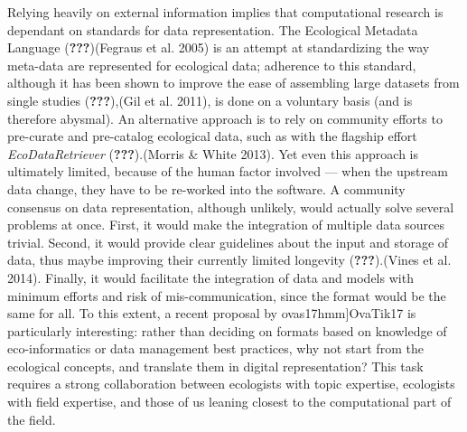 \documentclass[11pt,serif]{article}
\begin{document}
Relying heavily on external information implies that computational
research is dependant on standards for data representation. The
Ecological Metadata Language
\color{gray}({\textbf{???}})\color{black}\color{purple}(Fegraus et al.
2005)\color{black} is an attempt at standardizing the way meta-data are
represented for ecological data; adherence to this standard, although it
has been shown to improve the ease of assembling large datasets from
single studies
\color{gray}({\textbf{???}}),\color{black}\color{purple}(Gil et al.
2011),\color{black} is done on a voluntary basis (and is therefore
abysmal). An alternative approach is to rely on community efforts to
pre-curate and pre-catalog ecological data, such as with the flagship
effort \emph{EcoDataRetriever}
\color{gray}({\textbf{???}}).\color{black}\color{purple}(Morris \& White
2013).\color{black} Yet even this approach is ultimately limited,
because of the human factor involved --- when the upstream data change,
they have to be re-worked into the software. A community consensus on
data representation, although unlikely, would actually solve several
problems at once. First, it would make the integration of multiple data
sources trivial. Second, it would provide clear guidelines about the
input and storage of data, thus maybe improving their currently limited
longevity \color{gray}({\textbf{???}}).\color{black}\color{purple}(Vines
et al. 2014).\color{black} Finally, it would facilitate the integration
of data and models with minimum efforts and risk of mis-communication,
since the format would be the same for all. To this extent, a recent
proposal by
\color{gray}{[}ovas17hmm{]}\color{black}\color{purple}OvaTik17\color{black}
is particularly interesting: rather than deciding on formats based on
knowledge of eco-informatics or data management best practices, why not
start from the ecological concepts, and translate them in digital
representation? This task requires a strong collaboration between
ecologists with topic expertise, ecologists with field expertise, and
those of us leaning closest to the computational part of the field.
\end{document}
